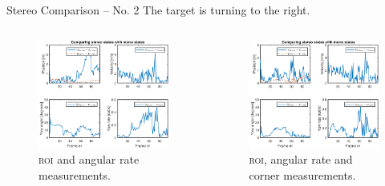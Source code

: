 \documentclass{beamer}
\newcommand{\roi}{\textsc{roi}\xspace}
\begin{document}
\begin{frame}{Stereo Comparison -- No. 2}
	The target is turning to the right.
	\begin{columns}[T]
	\begin{figure}
		\includegraphics[width=\textwidth]{Stereo/155733_RoiAngVel_gate_klt}
		\caption{\roi and angular rate measurements.}
	\end{figure}
	\begin{figure}
		\includegraphics[width=\textwidth]{Stereo/155733_AllMeasurements_gate_klt_perf}
		\caption{\roi, angular rate and corner measurements.}
	\end{figure}
	\end{columns}
\end{frame}
\end{document}
